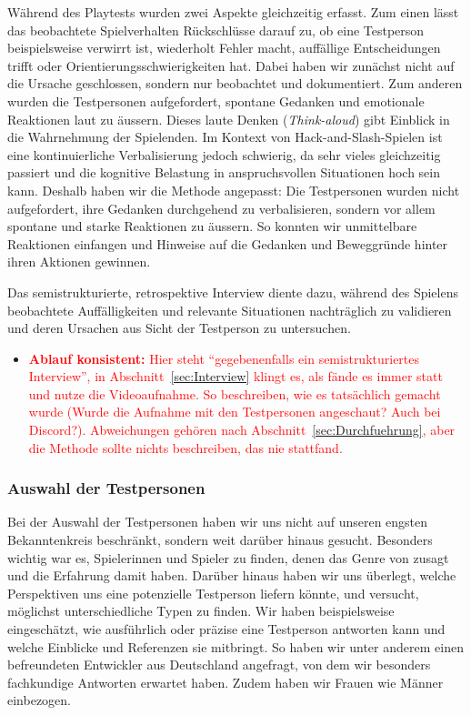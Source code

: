 \documentclass[../Main.tex]{subfiles}
\begin{document}
Während des Playtests wurden zwei Aspekte gleichzeitig erfasst. Zum einen lässt das beobachtete Spielverhalten Rückschlüsse darauf zu, ob eine Testperson beispielsweise verwirrt ist, wiederholt Fehler macht, auffällige Entscheidungen trifft oder Orientierungsschwierigkeiten hat. Dabei haben wir zunächst nicht auf die Ursache geschlossen, sondern nur beobachtet und dokumentiert. Zum anderen wurden die Testpersonen aufgefordert, spontane Gedanken und emotionale Reaktionen laut zu äussern. Dieses laute Denken (\textit{Think-aloud}) gibt Einblick in die Wahrnehmung der Spielenden.\autocite[\textcolor{red}{S.~??}]{drachen2018gamesuserresearch} Im Kontext von Hack-and-Slash-Spielen ist eine kontinuierliche Verbalisierung jedoch schwierig, da sehr vieles gleichzeitig passiert und die kognitive Belastung in anspruchsvollen Situationen hoch sein kann. Deshalb haben wir die Methode angepasst: Die Testpersonen wurden nicht aufgefordert, ihre Gedanken durchgehend zu verbalisieren, sondern vor allem spontane und starke Reaktionen zu äussern. So konnten wir unmittelbare Reaktionen einfangen und Hinweise auf die Gedanken und Beweggründe hinter ihren Aktionen gewinnen.

Das semistrukturierte, retrospektive Interview diente dazu, während des Spielens beobachtete Auffälligkeiten und relevante Situationen nachträglich zu validieren und deren Ursachen aus Sicht der Testperson zu untersuchen.\autocite[\textcolor{red}{S.~??}]{drachen2018gamesuserresearch}

\begin{itemize}[leftmargin=1.5cm]
    \item \textcolor{red}{\textbf{Ablauf konsistent:} Hier steht \enquote{gegebenenfalls ein semistrukturiertes Interview}, in Abschnitt~\ref{sec:Interview} klingt es, als fände es immer statt und nutze die Videoaufnahme. So beschreiben, wie es tatsächlich gemacht wurde (Wurde die Aufnahme mit den Testpersonen angeschaut? Auch bei Discord?). Abweichungen gehören nach Abschnitt~\ref{sec:Durchfuehrung}, aber die Methode sollte nichts beschreiben, das nie stattfand.}
\end{itemize}

\subsubsection{Auswahl der Testpersonen} \label{sec:AuswahlTP}
Bei der Auswahl der Testpersonen haben wir uns nicht auf unseren engsten Bekanntenkreis beschränkt, sondern weit darüber hinaus gesucht. Besonders wichtig war es, Spielerinnen und Spieler zu finden, denen das Genre von  zusagt und die Erfahrung damit haben. Darüber hinaus haben wir uns überlegt, welche Perspektiven uns eine potenzielle Testperson liefern könnte, und versucht, möglichst unterschiedliche Typen zu finden. Wir haben beispielsweise eingeschätzt, wie ausführlich oder präzise eine Testperson antworten kann und welche Einblicke und Referenzen sie mitbringt. So haben wir unter anderem einen befreundeten Entwickler aus Deutschland angefragt, von dem wir besonders fachkundige Antworten erwartet haben. Zudem haben wir Frauen wie Männer einbezogen.
\end{document}
